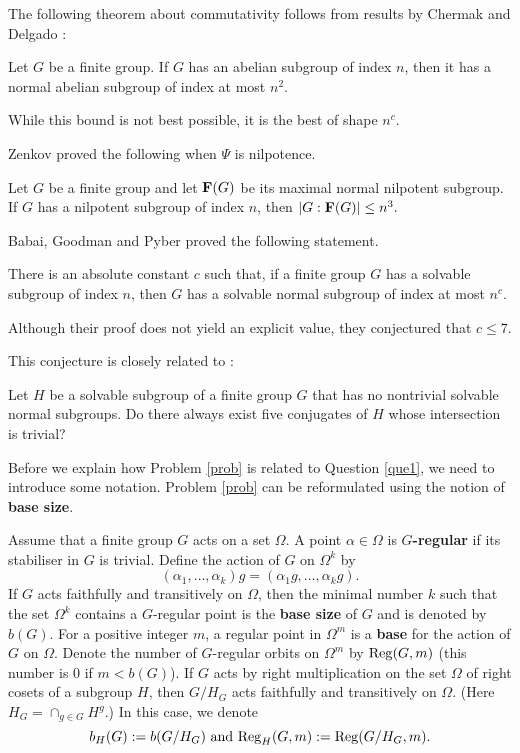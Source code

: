 The following theorem about commutativity follows from results  by Chermak and  Delgado \cite{cher}:
\begin{Th}
Let $G$ be a finite group. If $G$ has an abelian subgroup of index $n$, then 
 it has a normal abelian subgroup of index at most $n^2.$
\end{Th}
\noindent While this bound is not best possible, it is the best of shape $n^c.$

Zenkov \cite{zen21} proved the following  when $\Psi$ is nilpotence.

\begin{Th}
Let $G$ be a finite group and let ${\bf F}(G)$ be its maximal normal nilpotent subgroup.  If $G$ has a nilpotent subgroup of index $n$, then 
$|G:{\bf F}(G)| \le n^3.$
\end{Th}
Babai, Goodman and Pyber \cite{bab}   proved the following statement.

\begin{Th}\label{indexBab}
There is an absolute constant $c$ such that, if a finite group $G$ has a
solvable subgroup of index $n$, then $G$ has a solvable normal subgroup of index
at most $n^c$.
\end{Th}

\noindent Although their proof does not yield an explicit value, they  conjectured  that $c \le 7$.

This conjecture is closely related to  \cite[Problem 17.41 b)]{kt}:

\begin{Prob}\label{prob}
Let $H$ be a solvable subgroup of a finite group $G$ that has no nontrivial solvable
normal subgroups.
 Do there always exist five conjugates of $H$ whose intersection is trivial?
\end{Prob}

Before we explain how Problem \ref{prob} is related to Question \ref{que1}, we need to introduce some notation. Problem \ref{prob} can be reformulated using the notion of {\bf base size}.

\begin{Def}\label{def1}
Assume that a finite group $G$ acts on a set $\Omega.$ A point $\alpha \in \Omega$ is  $G${\bf-regular}   
 if its stabiliser in $G$ is trivial.
Define the action of  $G$ on $\Omega^k$ by 
$$(\alpha_1, \ldots,\alpha_k)g = (\alpha_1g,\ldots,\alpha_kg).$$
If $G$ acts faithfully and transitively on $\Omega$, then the minimal number $k$ such that the set $\Omega^k$ contains a 
$G$-regular point is the
{\bf base size}  of $G$ and is denoted by  $b(G).$ For a positive integer $m$, a regular point in $\Omega^m$  is a {\bf base}  for the action of $G$ on $\Omega.$
Denote the number of $G$-regular orbits on $\Omega^m$   by $\mathrm{Reg}(G,m)$ (this number is 0 if $m < b(G)$).
If  $G$ acts by  right multiplication on the set $\Omega$ of right cosets of a subgroup $H$, then $G/H_G$ acts faithfully and transitively on $\Omega.$ (Here $H_G=\cap_{g \in G} H^g.$) In this case, we denote 
$$b_H(G):=b(G/H_G) \text{ and } \mathrm{Reg}_H(G,m):=\mathrm{Reg}(G/H_G,m).$$
\end{Def}

